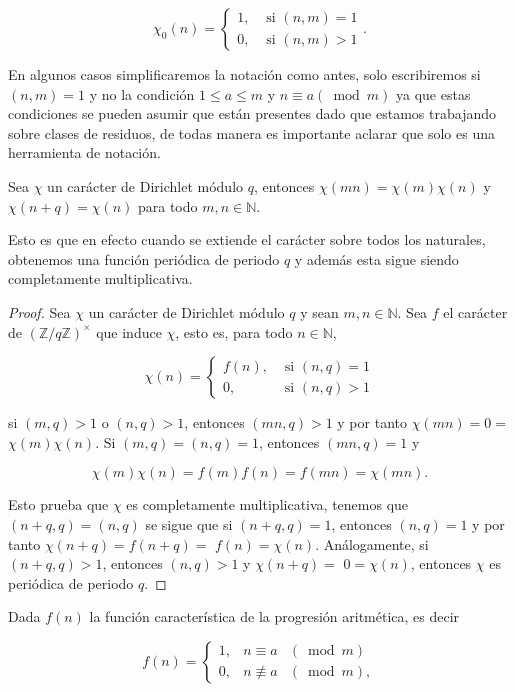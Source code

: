 $$\chi_0(n)= \begin{cases}1, & \text { si }(n, m)=1 \\ 0, & \text { si }(n, m)>1\end{cases}.$$

En algunos casos simplificaremos la notación como antes, solo escribiremos si $(n,m)=1$ y no la condición $1\leq a\leq m$ y $n\equiv a (\bmod{m})$ ya que estas condiciones se pueden asumir que están presentes dado que estamos trabajando sobre clases de residuos, de todas manera es importante aclarar que solo es una herramienta de notación.

\begin{theorem}
Sea $\chi$ un carácter de Dirichlet módulo $q$, entonces
$\chi(m n)=\chi(m) \chi(n)$ y $\chi(n+q)=\chi(n)$ para todo $m, n \in \mathbb{N}$.
\end{theorem}

Esto es que en efecto cuando se extiende el carácter sobre todos los naturales, obtenemos una función periódica de periodo $q$ y  además esta sigue siendo completamente multiplicativa.\\

\begin{proof}
Sea $\chi$ un carácter de Dirichlet módulo $q$ y sean $m, n \in \mathbb{N}$. Sea $f$ el  carácter de $(\mathbb{Z} / q \mathbb{Z})^{\times}$ que induce $\chi$, esto es, para todo $n \in \mathbb{N}$,

$$
\chi(n)= \begin{cases}f(n), & \text { si }(n, q)=1 \\ 0, & \text { si }(n,q)>1\end{cases}
$$


si $(m, q)>1$ o $(n, q)>1$, entonces $(m n, q)>1$ y por tanto $\chi(m n)=0=$ $\chi(m) \chi(n)$. Si $(m, q)=(n, q)=1$, entonces $(m n, q)=1$ y

$$
\chi(m) \chi(n)=f(m) f(n)=f(mn)=\chi(m n) .
$$


Esto prueba que $\chi$ es completamente multiplicativa, tenemos que $(n+q, q)=(n, q)$ se sigue que si $(n+q, q)=1$, entonces $(n, q)=1$ y por tanto $\chi(n+q)=f(n+q)=$ $f(n)=\chi(n)$. Análogamente, si $(n+q, q)>1$, entonces $(n, q)>1$ y $\chi(n+q)=$ $0=\chi(n)$, entonces $\chi$ es periódica de periodo $q$.

\end{proof}

 Dada $f(n)$ la función característica de la progresión aritmética, es decir

$$
f(n)=\left\{\begin{array}{lll}
1, & n \equiv a & (\bmod{m} ) \\
0, & n \not\equiv a & (\bmod{m}),
\end{array}\right.
$$

